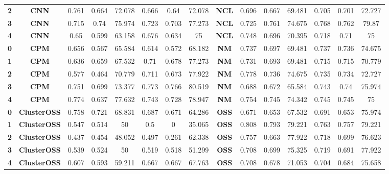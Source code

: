 {{\begin{tabular}{c|c|cccccc|ccccccc}
\textbf{2} & \textbf{CNN} & 0.761 & 0.664 & 72.078 & 0.666 & 0.64  & 72.078 & \multicolumn{1}{c|}{\textbf{NCL}} & 0.696 & 0.667 & 69.481 & 0.705 & 0.701 & 72.727 \\
\textbf{3} & \textbf{CNN} & 0.715 & 0.74  & 75.974 & 0.723 & 0.703 & 77.273 & \multicolumn{1}{c|}{\textbf{NCL}} & 0.725 & 0.761 & 74.675 & 0.768 & 0.762 & 79.87 \\
\textbf{4} & \textbf{CNN} & 0.65  & 0.599 & 63.158 & 0.676 & 0.634 & 75    & \multicolumn{1}{c|}{\textbf{NCL}} & 0.748 & 0.696 & 70.395 & 0.718 & 0.71  & 75 \\
\textbf{0} & \textbf{CPM} & 0.656 & 0.567 & 65.584 & 0.614 & 0.572 & 68.182 & \multicolumn{1}{c|}{\textbf{NM}} & 0.737 & 0.697 & 69.481 & 0.737 & 0.736 & 74.675 \\
\textbf{1} & \textbf{CPM} & 0.636 & 0.659 & 67.532 & 0.71  & 0.678 & 77.273 & \multicolumn{1}{c|}{\textbf{NM}} & 0.731 & 0.693 & 69.481 & 0.715 & 0.715 & 70.779 \\
\textbf{2} & \textbf{CPM} & 0.577 & 0.464 & 70.779 & 0.711 & 0.673 & 77.922 & \multicolumn{1}{c|}{\textbf{NM}} & 0.778 & 0.736 & 74.675 & 0.735 & 0.734 & 72.727 \\
\textbf{3} & \textbf{CPM} & 0.751 & 0.699 & 73.377 & 0.773 & 0.766 & 80.519 & \multicolumn{1}{c|}{\textbf{NM}} & 0.688 & 0.672 & 65.584 & 0.743 & 0.74  & 75.974 \\
\textbf{4} & \textbf{CPM} & 0.774 & 0.637 & 77.632 & 0.743 & 0.728 & 78.947 & \multicolumn{1}{c|}{\textbf{NM}} & 0.754 & 0.745 & 74.342 & 0.745 & 0.745 & 75 \\
\textbf{0} & \textbf{ClusterOSS} & 0.758 & 0.721 & 68.831 & 0.687 & 0.671 & 64.286 & \multicolumn{1}{c|}{\textbf{OSS}} & 0.671 & 0.653 & 67.532 & 0.691 & 0.653 & 75.974 \\
\textbf{1} & \textbf{ClusterOSS} & 0.547 & 0.514 & 50    & 0.5   & 0     & 35.065 & \multicolumn{1}{c|}{\textbf{OSS}} & 0.808 & 0.793 & 79.221 & 0.763 & 0.757 & 79.221 \\
\textbf{2} & \textbf{ClusterOSS} & 0.437 & 0.454 & 48.052 & 0.497 & 0.261 & 62.338 & \multicolumn{1}{c|}{\textbf{OSS}} & 0.757 & 0.663 & 77.922 & 0.718 & 0.699 & 76.623 \\
\textbf{3} & \textbf{ClusterOSS} & 0.539 & 0.524 & 50    & 0.519 & 0.518 & 51.299 & \multicolumn{1}{c|}{\textbf{OSS}} & 0.708 & 0.699 & 75.325 & 0.719 & 0.691 & 77.922 \\
\textbf{4} & \textbf{ClusterOSS} & 0.607 & 0.593 & 59.211 & 0.667 & 0.667 & 67.763 & \multicolumn{1}{c|}{\textbf{OSS}} & 0.708 & 0.678 & 71.053 & 0.704 & 0.684 & 75.658 \\

\end{tabular}}}
